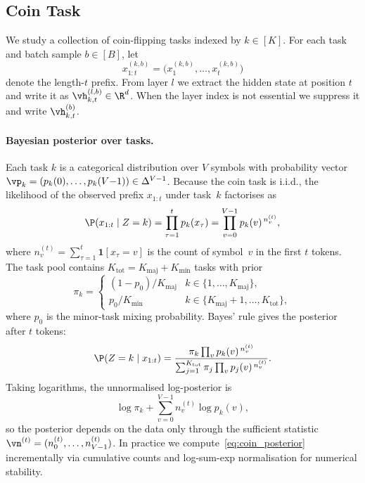 
\subsection{Coin Task}

We study a collection of coin-flipping tasks indexed by $k \in [K]$. For each
task and batch sample $b \in [B]$, let
\[
x^{(k,b)}_{1:t} = \bigl(x^{(k,b)}_1, \ldots, x^{(k,b)}_t\bigr)
\]
denote the length-$t$ prefix. From layer $l$ we extract the hidden state at
position $t$ and write it as $\vh^{(l,b)}_{k,t} \in \R^d$. When the layer index
is not essential we suppress it and write $\vh^{(b)}_{k,t}$.

\paragraph{Bayesian posterior over tasks.}
Each task $k$ is a categorical distribution over $V$ symbols with probability
vector $\vp_k = (p_k(0), \ldots, p_k(V{-}1)) \in \Delta^{V-1}$.
Because the coin task is i.i.d., the likelihood of the observed prefix
$x_{1:t}$ under task~$k$ factorises as
\[
  \P(x_{1:t} \mid Z = k)
  = \prod_{\tau=1}^{t} p_k(x_\tau)
  = \prod_{v=0}^{V-1} p_k(v)^{\,n_v^{(t)}},
\]
where $n_v^{(t)} = \sum_{\tau=1}^{t} \mathbf{1}[x_\tau = v]$ is the count of
symbol~$v$ in the first $t$ tokens.
The task pool contains $K_{\mathrm{tot}} = K_{\mathrm{maj}} + K_{\mathrm{min}}$
tasks with prior
\[
  \pi_k =
  \begin{cases}
    (1 - p_0) / K_{\mathrm{maj}} & k \in \{1, \ldots, K_{\mathrm{maj}}\}, \\
    p_0 / K_{\mathrm{min}}       & k \in \{K_{\mathrm{maj}}+1, \ldots, K_{\mathrm{tot}}\},
  \end{cases}
\]
where $p_0$ is the minor-task mixing probability.
Bayes' rule gives the posterior after $t$ tokens:
\begin{equation}
\label{eq:coin_posterior}
  \P(Z = k \mid x_{1:t})
  = \frac{\pi_k \prod_{v} p_k(v)^{\,n_v^{(t)}}}
         {\sum_{j=1}^{K_{\mathrm{tot}}} \pi_j \prod_{v} p_j(v)^{\,n_v^{(t)}}}.
\end{equation}
Taking logarithms, the unnormalised log-posterior is
\[
  \log \pi_k + \sum_{v=0}^{V-1} n_v^{(t)} \log p_k(v),
\]
so the posterior depends on the data only through the sufficient statistic
$\vn^{(t)} = (n_0^{(t)}, \ldots, n_{V-1}^{(t)})$.
In practice we compute~\eqref{eq:coin_posterior} incrementally via cumulative
counts and log-sum-exp normalisation for numerical stability.


